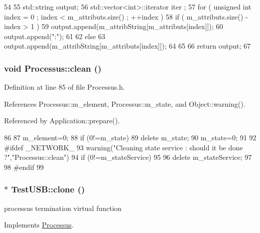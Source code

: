 \begin{DoxyCode}
54                             {
55   std::string output;
56   std::vector<int>::iterator iter ;
57   for ( unsigned int index = 0 ; index < m_attributs.size() ; ++index ) {
58     if ( m_attributs.size() - index > 1 ) {
59       output.append(m_attribString[m_attributs[index]]);
60       output.append(":");
61     }
62     else {
63       output.append(m_attribString[m_attributs[index]]);
64     }
65   }
66   return output;
67 }
\end{DoxyCode}
\hypertarget{classProcessus_aaeb17673b98d2b39f3aa780e335e0968}{
\subsubsection[{clean}]{\setlength{\rightskip}{0pt plus 5cm}void Processus::clean ()}}
\label{classProcessus_aaeb17673b98d2b39f3aa780e335e0968}


Definition at line 85 of file Processus.h.

References Processus::m\_\-element, Processus::m\_\-state, and Object::warning().

Referenced by Application::prepare().


\begin{DoxyCode}
86   {
87     m_element=0;
88     if (0!=m_state) {
89       delete m_state;
90       m_state=0;
91     }
92 #ifdef _NETWORK_
93     warning("Cleaning state service : should it be done ?","Processus::clean")
94       if (0!=m_stateService)
95       {
96         delete m_stateService;
97       }
98 #endif
99   }
\end{DoxyCode}
\hypertarget{classTestUSB_a109094c177ccaaa224b514c118c93ce7}{
\subsubsection[{clone}]{$\ast$ TestUSB::clone ()}}
\label{classTestUSB_a109094c177ccaaa224b514c118c93ce7}
processus termination virtual function 

Implements \hyperlink{classProcessus_aca8856f6d6d7b7e1fe941f298dcbb502}{Processus}.

